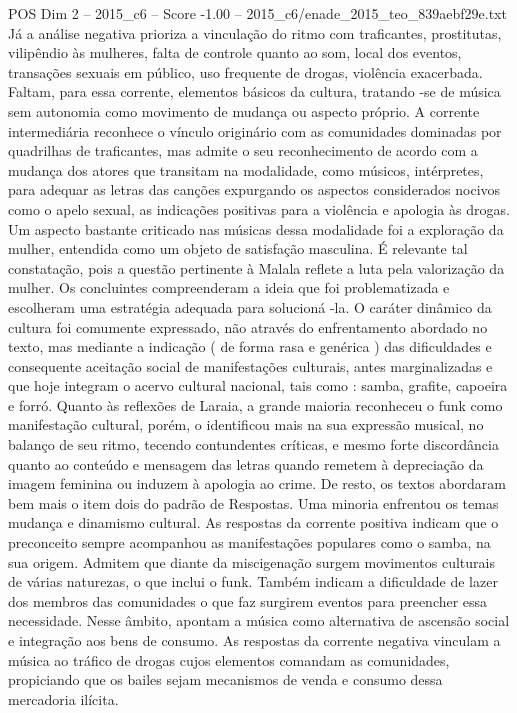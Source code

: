 \begin{textsample}{POS Dim 2 – 2015\_c6 – Score -1.00 – 2015\_c6/enade\_2015\_teo\_839aebf29e.txt}
Já a análise negativa prioriza a vinculação do ritmo com traficantes, prostitutas, vilipêndio às mulheres, falta de controle quanto ao som, local dos eventos, transações sexuais em público, uso frequente de drogas, violência exacerbada.
Faltam, para essa corrente, elementos básicos da cultura, tratando -se de música sem autonomia como movimento de mudança ou aspecto próprio.
A corrente intermediária reconhece o vínculo originário com as comunidades dominadas por quadrilhas de traficantes, mas admite o seu reconhecimento de acordo com a mudança dos atores que transitam na modalidade, como músicos, intérpretes, para adequar as letras das canções expurgando os aspectos considerados nocivos como o apelo sexual, as indicações positivas para a violência e apologia às drogas.
Um aspecto bastante criticado nas músicas dessa modalidade foi a exploração da mulher, entendida como um objeto de satisfação masculina.
É relevante tal constatação, pois a questão pertinente à Malala reflete a luta pela valorização da mulher.
Os concluintes compreenderam a ideia que foi problematizada e escolheram uma estratégia adequada para solucioná -la.
O caráter dinâmico da cultura foi comumente expressado, não através do enfrentamento abordado no texto, mas mediante a indicação ( de forma rasa e genérica ) das dificuldades e consequente aceitação social de manifestações culturais, antes marginalizadas e que hoje integram o acervo cultural nacional, tais como : samba, grafite, capoeira e forró.
Quanto às reflexões de Laraia, a grande maioria reconheceu o funk como manifestação cultural, porém, o identificou mais na sua expressão musical, no balanço de seu ritmo, tecendo contundentes críticas, e mesmo forte discordância quanto ao conteúdo e mensagem das letras quando remetem à depreciação da imagem feminina ou induzem à apologia ao crime.
De resto, os textos abordaram bem mais o item dois do padrão de Respostas.
Uma minoria enfrentou os temas mudança e dinamismo cultural.
As respostas da corrente positiva indicam que o preconceito sempre acompanhou as manifestações populares como o samba, na sua origem.
Admitem que diante da miscigenação surgem movimentos culturais de várias naturezas, o que inclui o funk.
Também indicam a dificuldade de lazer dos membros das comunidades o que faz surgirem eventos para preencher essa necessidade.
Nesse âmbito, apontam a música como alternativa de ascensão social e integração aos bens de consumo.
As respostas da corrente negativa vinculam a música ao tráfico de drogas cujos elementos comandam as comunidades, propiciando que os bailes sejam mecanismos de venda e consumo dessa mercadoria ilícita.

\end{textsample}
